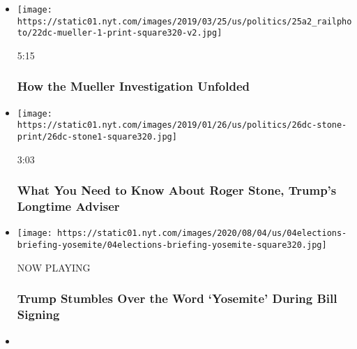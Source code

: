 \begin{itemize}
\item
  \href{https://www.nytimes.com/video/us/politics/100000006381390/robert-mueller-report-background.html?action=click\&module=video-series-bar\&region=header\&pgtype=Article\&playlistId=video/us-politics}{}

  \texttt{[image: https://static01.nyt.com/images/2019/03/25/us/politics/25a2\_railphoto/22dc-mueller-1-print-square320-v2.jpg]}

  5:15

  \hypertarget{how-the-mueller-investigation-unfolded}{%
  \subsubsection{How the Mueller Investigation
  Unfolded}\label{how-the-mueller-investigation-unfolded}}
\item
  \href{https://www.nytimes.com/video/us/politics/100000006236443/who-is-roger-stone.html?action=click\&module=video-series-bar\&region=header\&pgtype=Article\&playlistId=video/us-politics}{}

  \texttt{[image: https://static01.nyt.com/images/2019/01/26/us/politics/26dc-stone-print/26dc-stone1-square320.jpg]}

  3:03

  \hypertarget{what-you-need-to-know-about-roger-stone-trumps-longtime-adviser}{%
  \subsubsection{What You Need to Know About Roger Stone, Trump's
  Longtime
  Adviser}\label{what-you-need-to-know-about-roger-stone-trumps-longtime-adviser}}
\item
  \texttt{[image: https://static01.nyt.com/images/2020/08/04/us/04elections-briefing-yosemite/04elections-briefing-yosemite-square320.jpg]}

  NOW PLAYING

  \hypertarget{trump-stumbles-over-the-word-yosemite-during-bill-signing-2}{%
  \subsubsection{Trump Stumbles Over the Word `Yosemite' During Bill
  Signing}\label{trump-stumbles-over-the-word-yosemite-during-bill-signing-2}}
\item
  \href{https://www.nytimes.com/video/us/100000007267362/white-house-mail-in-ballots-election.html?action=click\&module=video-series-bar\&region=header\&pgtype=Article\&playlistId=video/us-politics}{}


\end{itemize}
